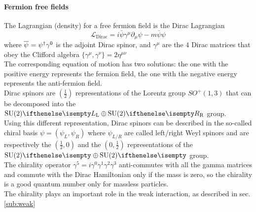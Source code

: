 \paragraph*{Fermion free fields}
The Lagrangian (density) for a free fermion field is the Dirac Lagrangian
\begin{equation}\label{eq:Dirac}
\mathcal{L}_{\text{Dirac}}=i\bar{\psi}\gamma^{\mu}\partial_{\mu}\psi-m\bar{\psi}\psi
\end{equation}
where $\aff{\psi}{}=\ff{\psi}{}^\dagger\gamma^0$ is the adjoint Dirac spinor, and $\gamma^\mu$ are the 4 Dirac matrices that obey the Clifford algebra $\{\gamma^\mu,\gamma^\nu\}=2\eta^{\mu\nu}$\\
The corresponding equation of motion has two solutions: the one with the positive energy represents the fermion field, the one with the negative energy represents the anti-fermion field.\\
Dirac spinors are $\left( \frac{1}{2} \right)$ representations of the Lorentz group $SO^+(1,3)$ that can be decomposed into the $\SU[L]{2} \oplus \SU[R]{2}$ group.\\
Using this different representation, Dirac spinors can be described in the so-called chiral basis $\psi=\left(\psi_L,\psi_R \right)$ where $\psi_{L/R}$ are called left/right Weyl spinors and are respectively the $\left(\frac{1}{2},0\right)$ and the $\left(0,\frac{1}{2}\right)$ representations of the $\SU{2} \oplus \SU{2}$ group.\\
The chirality operator $\gamma^5=i\gamma^0\gamma^1\gamma^2\gamma^3$ anti-commutes with all the gamma matrices and commute with the Dirac Hamiltonian only if the mass is zero, so the chirality is a good quantum number only for massless particles.\\
The chirality plays an important role in the weak interaction, as described in sec. \ref{sub:weak}
